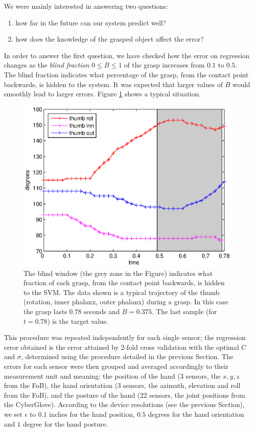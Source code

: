 We were mainly interested in answering two questions:

\begin{enumerate}

  \item how far in the future can our system predict well?

  \item how does the knowledge of the grasped object affect the error?

\end{enumerate}

In order to answer the first question, we have checked how the error
on regression changes as the \emph{blind fraction} $0 \leq B \leq 1$
of the grasp increases from $0.1$ to $0.5$. The blind fraction
indicates what percentage of the grasp, from the contact point
backwards, is hidden to the system. It was expected that larger values
of $B$ would smoothly lead to larger errors. Figure
\ref{fig:B_example} shows a typical situation.

\begin{figure}[htbp]
  \begin{center}
    \includegraphics[width=0.5\linewidth]{B_example.eps}
    \caption{The blind window (the grey zone in the Figure) indicates
    what fraction of each grasp, from the contact point backwards, is
    hidden to the SVM. The data shown is a typical trajectory of the
    thumb (rotation, inner phalanx, outer phalanx) during a grasp. In
    this case the grasp lasts $0.78$ seconds and $B=0.375$. The last
    sample (for $t=0.78$) is the target value.}
    \label{fig:B_example}
  \end{center}
\end{figure}

This procedure was repeated independently for each single sensor; the
regression error obtained is the error attained by $2$-fold cross
validation with the optimal $C$ and $\sigma$, determined using the
procedure detailed in the previous Section. The errors for each sensor
were then grouped and averaged accordingly to their measurement unit
and meaning: the position of the hand ($3$ sensors, the $x,y,z$ from
the FoB), the hand orientation ($3$ sensors, the azimuth, elevation
and roll from the FoB), and the posture of the hand ($22$ sensors, the
joint positions from the CyberGlove). According to the device
resolutions (see the previous Section), we set $\epsilon$ to $0.1$
inches for the hand position, $0.5$ degrees for the hand orientation
and $1$ degree for the hand posture.

